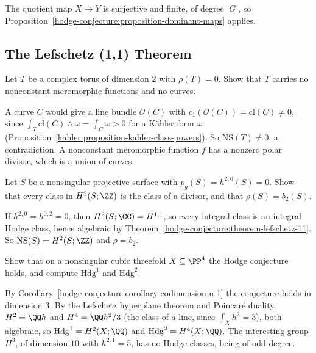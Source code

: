 \begin{solution}
The quotient map $X \to Y$ is surjective and finite, of degree $|G|$, so Proposition~\ref{hodge-conjecture:proposition-dominant-maps} applies.
\end{solution}

\subsection{The Lefschetz (1,1) Theorem}\label{hodge-conjecture:subsection-exercises-lefschetz-11}

\begin{exercise}\label{hodge-conjecture:exercise-picard-number-torus}
Let $T$ be a complex torus of dimension $2$ with $\rho(T) = 0$. Show that $T$ carries no nonconstant meromorphic functions and no curves.
\end{exercise}

\begin{solution}
A curve $C$ would give a line bundle $\mathcal{O}(C)$ with $c_1(\mathcal{O}(C)) = \mathrm{cl}(C) \neq 0$, since $\int_T\mathrm{cl}(C) \wedge \omega = \int_C\omega > 0$ for a K\"ahler form $\omega$
(Proposition~\ref{kahler:proposition-kahler-class-powers}). So $\mathrm{NS}(T) \neq 0$, a contradiction. A nonconstant meromorphic function $f$ has a nonzero polar divisor, which is a union of
curves.
\end{solution}

\begin{exercise}\label{hodge-conjecture:exercise-hodge-classes-surface}
Let $S$ be a nonsingular projective surface with $p_g(S) = h^{2,0}(S) = 0$. Show that every class in $H^2(S; \ZZ)$ is the class of a divisor, and that $\rho(S) = b_2(S)$.
\end{exercise}

\begin{solution}
If $h^{2,0} = h^{0,2} = 0$, then $H^2(S; \CC) = H^{1,1}$, so every integral class is an integral Hodge class, hence algebraic by Theorem~\ref{hodge-conjecture:theorem-lefschetz-11}. So
$\mathrm{NS}(S) = H^2(S; \ZZ)$ and $\rho = b_2$.
\end{solution}

\begin{exercise}\label{hodge-conjecture:exercise-cubic-threefold}
Show that on a nonsingular cubic threefold $X \subseteq \PP^4$ the Hodge conjecture holds, and compute $\mathrm{Hdg}^1$ and $\mathrm{Hdg}^2$.
\end{exercise}

\begin{solution}
By Corollary~\ref{hodge-conjecture:corollary-codimension-n-1} the conjecture holds in dimension $3$. By the Lefschetz hyperplane theorem and Poincar\'e duality, $H^2 = \QQ h$ and $H^4 = \QQ h^2/3$
(the class of a line, since $\int_Xh^3 = 3$), both algebraic, so $\mathrm{Hdg}^1 = H^2(X; \QQ)$ and $\mathrm{Hdg}^2 = H^4(X; \QQ)$. The interesting group $H^3$, of dimension $10$ with $h^{2,1} = 5$, has
no Hodge classes, being of odd degree.
\end{solution}
